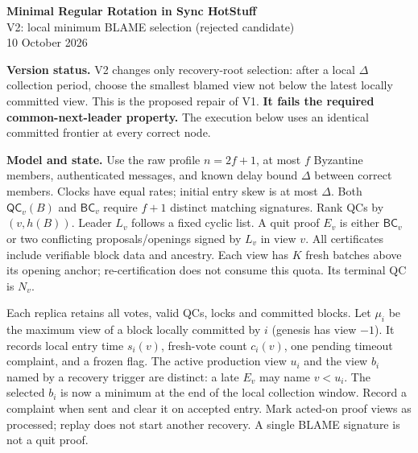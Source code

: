 \documentclass[10pt,a4paper]{article}
\newcommand{\QC}{\mathsf{QC}}
\newcommand{\BC}{\mathsf{BC}}
\newcommand{\chg}[1]{\textcolor{red!70!black}{#1}}
\begin{document}
\begin{center}
{\Large\bfseries Minimal Regular Rotation in Sync HotStuff}\\[3pt]
{\large V2: local minimum BLAME selection (rejected candidate)}\\[3pt]
10 October 2026
\end{center}

\textbf{Version status.} V2 changes only recovery-root selection: after a
local $\Delta$ collection period, choose the smallest blamed view not below
the latest locally committed view. This is the proposed repair of V1.
\textbf{It fails the required common-next-leader property.} The execution
below uses an identical committed frontier at every correct node.

\textbf{Model and state.} Use the raw profile $n=2f+1$, at most $f$
Byzantine members, authenticated messages, and known delay bound $\Delta$
between correct members. Clocks have equal rates; initial entry skew is at
most $\Delta$. Both $\QC_v(B)$ and $\BC_v$ require $f+1$ distinct matching
signatures. Rank QCs by $(v,h(B))$. Leader $L_v$ follows a fixed cyclic list.
A quit proof $E_v$ is either $\BC_v$ or two conflicting proposals/openings
signed by $L_v$ in view $v$. All certificates include verifiable block data
and ancestry. Each view has $K$ fresh batches above its opening anchor;
re-certification does not consume this quota. Its terminal QC is $N_v$.

Each replica retains all votes, valid QCs, locks and committed blocks.
Let $\mu_i$ be the maximum view of a block locally committed by $i$
(genesis has view $-1$). It records local entry time $s_i(v)$, fresh-vote
count $c_i(v)$, one pending
timeout complaint, and a frozen flag. \chg{The active production view $u_i$
and the view $b_i$ named by a recovery trigger are distinct: a late $E_v$
may name $v<u_i$. The selected $b_i$ is now a minimum at the end of
the local collection window.} Record a complaint when sent and clear it on accepted entry.
Mark acted-on proof views as processed; replay does not start another recovery.
A single BLAME signature is not a quit proof.
\end{document}
